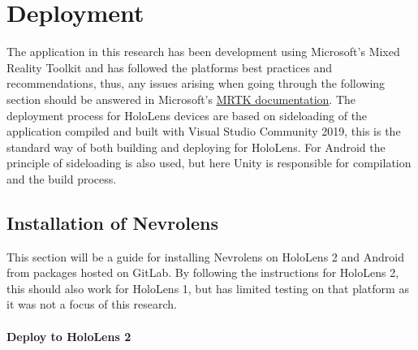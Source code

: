 \chapter{Deployment}

The application in this research has been development using Microsoft's Mixed Reality Toolkit and has followed the platforms best practices and recommendations, thus, any issues arising when going through the following section should be answered in Microsoft's \href{https://docs.microsoft.com/en-us/windows/mixed-reality/mrtk-unity}{MRTK documentation}. The deployment process for HoloLens devices are based on sideloading of the application compiled and built with Visual Studio Community 2019, this is the standard way of both building and deploying for HoloLens. For Android the principle of sideloading is also used, but here Unity is responsible for compilation and the build process. 


\section{Installation of Nevrolens}

This section will be a guide for installing Nevrolens on HoloLens 2 and Android from packages hosted on GitLab.
By following the instructions for HoloLens 2, this should also work for HoloLens 1, but has limited testing on that platform as it was not a focus of this research.

\subsubsection{Deploy to HoloLens 2}

